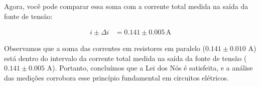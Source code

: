 \documentclass{article}
\begin{document}
Agora, você pode comparar essa soma com a corrente total medida na saída da fonte de tensão:

\begin{align*}
i \pm \Delta i &= 0.141 \pm 0.005 \, \text{A}
\end{align*}

Observamos que a soma das correntes em resistores em paralelo (\(0.141 \pm 0.010\) A) está dentro do intervalo da corrente total medida na saída da fonte de tensão (\(0.141 \pm 0.005\) A). Portanto, concluímos que a Lei dos Nós é satisfeita, e a análise das medições corrobora esse princípio fundamental em circuitos elétricos.
  
\end{document}
